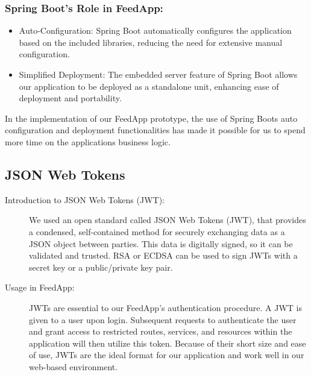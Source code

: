 \subsubsection{Spring Boot's Role in FeedApp:}
\begin{itemize}
    \item Auto-Configuration: Spring Boot automatically configures the application based on the included libraries, reducing the need for extensive manual configuration.
    \item Simplified Deployment: The embedded server feature of Spring Boot allows our application to be deployed as a standalone unit, enhancing ease of deployment and portability.
\end{itemize}

In the implementation of our FeedApp prototype, the use of Spring Boots auto configuration and deployment functionalities has made it possible for us to spend more time on the applications business logic. 

\subsection{JSON Web Tokens}
\begin{description}
 \item[Introduction to JSON Web Tokens (JWT):]
We used an open standard called JSON Web Tokens (JWT), that provides a condensed, self-contained method for securely exchanging data as a JSON object between parties. This data is digitally signed, so it can be validated and trusted. RSA or ECDSA can be used to sign JWTs with a secret key or a public/private key pair.

 \item[Usage in FeedApp:]
JWTs are essential to our FeedApp's authentication procedure. A JWT is given to a user upon login. Subsequent requests to authenticate the user and grant access to restricted routes, services, and resources within the application will then utilize this token. Because of their short size and ease of use, JWTs are the ideal format for our application and work well in our web-based environment.
\end{description}

